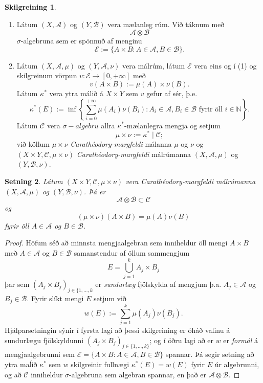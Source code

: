 \documentclass[a4paper,icelandic,11pt]{book}
\theoremstyle{plain}      \newtheorem{setn}{Setning}[chapter]
\theoremstyle{definition} \newtheorem{skilgr}[setn]{Skilgreining}
\theoremstyle{remark}     \newtheorem*{ath}{Athugasemd}
\newcommand{\N}{\mathbb N}
\begin{document}
\begin{skilgr}
  \begin{enumerate}[(1)]
  \item Látum $(X,\mathcal A)$ og $(Y,\mathcal B)$ vera mælanleg
    rúm. Við táknum með 
    \[
    \mathcal A \otimes \mathcal B
    \]
    $\sigma$-algebruna sem er spönnuð af menginu
    \[
    \mathcal E
    := \{ A\times B : A\in\mathcal A, B\in\mathcal B \}.
    \]
  \item Látum $(X,\mathcal A,\mu)$ og $(Y,\mathcal A,\nu)$ vera
    málrúm, látum $\mathcal E$ vera eins og í (1) og skilgreinum
    vörpun $v:\mathcal E\to[0,+\infty]$ með
    \[
    v(A\times B) := \mu(A)\times\nu(B).
    \]
    Látum $\kappa^{*}$ vera ytra málið á $X\times Y$ sem $v$ gefur af
    sér, þ.e. 
    \[
    \kappa^{*}(E) := \inf
    \left\{
      \sum_{i=0}^{+\infty}\mu(A_{i})\nu(B_{i})
      : A_{i}\in \mathcal A,
      B_{i}\in\mathcal B
      \text{ fyrir öll }i\in\N
    \right\}.
    \]
    Látum $\mathcal C$ vera $\sigma-algebru$ allra
    $\kappa^{*}$-mælanlegra mengja og setjum 
    \[
    \mu\times\nu := \kappa^{*}\mid\mathcal C;
    \]
    við köllum $\mu\times\nu$
    \emph{Carathéodory-margfeldi}
    málanna $\mu$ og $\nu$ og $(X\times Y,\mathcal C,\mu\times\nu)$
    \emph{Carathéodory-margfeldi} málrúmanna $(X,\mathcal A,\mu)$ og
    $(Y,\mathcal B,\nu)$.
  \end{enumerate}
\end{skilgr}
\begin{setn}
  Látum $(X\times Y,\mathcal C,\mu\times\nu)$ vera
  Carathéodory-margfeldi málrúmanna $(X,\mathcal A,\mu)$ og
  $(Y,\mathcal B,\nu)$. Þá er 
  \[
  \mathcal A\otimes \mathcal B\subset \mathcal C
  \]
  og 
  \[
  (\mu\times \nu)(A\times B)
  = \mu(A)\nu(B)
  \]
  fyrir öll $A\in\mathcal A$ og $B\in\mathcal B$.
\end{setn}
\begin{proof}
  Höfum séð að minnsta mengjaalgebran sem inniheldur öll mengi
  $A\times B$ með $A\in\mathcal A$ og $B\in\mathcal B$ samanstendur af
  öllum sammengjum 
  \[
  E = \bigcup_{j=1}^{k}A_{j}\times B_{j}
  \]
  þar sem $(A_{j}\times B_{j})_{j\in\{1,\dots,k}$ er \emph{sundurlæg}
  fjölskylda af mengjum þ.a. $A_{j}\in\mathcal A$ og $B_{j}\in\mathcal
  B$. Fyrir slíkt mengi $E$ setjum við 
  \[
  w(E) := \sum_{j=1}^{k}\mu(A_{j})\nu(B_{j}).
  \]
  Hjálparsetningin sýnir í fyrsta lagi að þessi skilgreining er óháð
  valinu á sundurlægu fjölskyldunni $(A_{j}\times
  B_{j})_{j\in\{1,\dots,k\}}$; og í öðru lagi að er $w$ er
  \emph{formál} á mengjaalgebrunni sem $\mathcal E = \{A\times B :
  A\in\mathcal A, B\in\mathcal B \}$ spannar. Þá segir setning að ytra
  maĺið $\kappa^{*}$ sem $w$ skilgreinir fullnægi $\kappa^{*}(E)=w(E)$
  fyrir $E$ úr algebrunni, og að $\mathcal C$ inniheldur
  $\sigma$-algebruna sem algebran spannar, en það er $\mathcal
  A\otimes\mathcal B$.
\end{proof}
\end{document}

